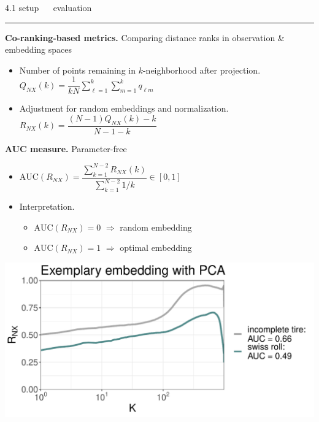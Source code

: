 \documentclass[11pt, compress, t, notes = noshow, xcolor = table, 
aspectratio = 1610]{beamer}
\newcommand{\highlight}[1]{\textcolor{highlightcol}{\textbf{#1}}}
\newcommand{\arritem}{\item[\highlight{$\rightarrow$}]}
\newcommand{\flexitem}[1]{\item[$\highlight{#1}$]}
\begin{document}
\LARGE
\begin{frame}{\textcolor{gray!90}{4.1 setup} ~~ evaluation}
\normalsize
\vspace{-0.5cm}
\noindent \textcolor{gray!90}{\rule{\textwidth}{1pt}}
\smallskip

\textbf{Co-ranking-based metrics.} Comparing distance ranks in observation \& 
embedding spaces

\begin{itemize}
  \arritem Number of points remaining in $k$-neighborhood after projection. 
  $Q_{NX}(k) = \dfrac{1}{kN} \sum_{\ell = 1}^k \sum_{m = 1}^k 
  q_{\ell m}$
  \arritem Adjustment for random embeddings and normalization. \\ 
  $R_{NX}(k) = \dfrac{(N - 1) Q_{NX}(k) - k}{N - 1 - k}$
\end{itemize}

\vspace{0.3cm}

\begin{minipage}[b]{0.6\textwidth}
  \textbf{AUC measure.} Parameter-free
  \begin{itemize}
    \arritem $\text{AUC}(R_{NX}) = \dfrac{\sum_{k = 1}^{N - 2} R_{NX}(k)}{
    \sum_{k = 1}^{N - 2} 1 / k} \in [0, 1]$
    \arritem Interpretation.
    \begin{itemize}
      \flexitem{1} $\text{AUC}(R_{NX}) = 0$ $\Rightarrow$ random embedding
      \flexitem{2} $\text{AUC}(R_{NX}) = 1$ $\Rightarrow$ optimal embedding
    \end{itemize}
\end{itemize}
\end{minipage}%
\begin{minipage}[b]{0.4\textwidth}
  \includegraphics[trim = 0 0 0 0, clip, %
    width = \textwidth]{figures/rnx_curve}
\end{minipage}

\end{frame}
\end{document}
